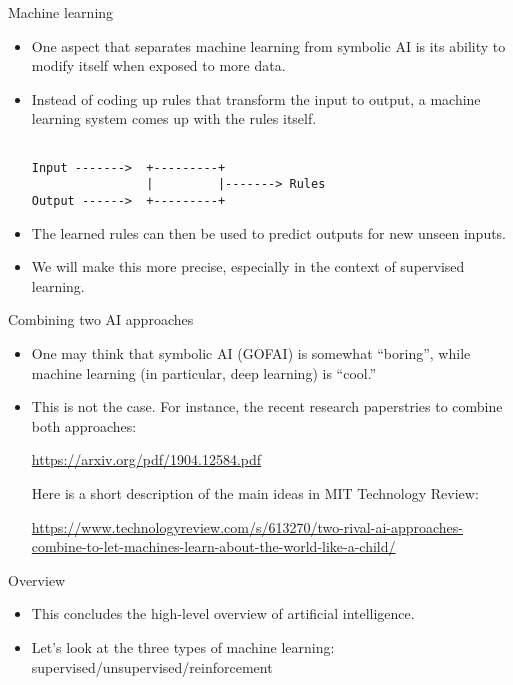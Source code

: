 \documentclass{beamer}
\begin{document}
\begin{frame}[fragile]{Machine learning}
\begin{itemize}
\item One aspect that separates machine learning from symbolic AI is its ability to modify itself when exposed to more data.

\item Instead of coding up rules that transform the input to output, a machine learning system comes up with the rules itself.

\begin{verbatim}

Input ------->  +---------+
                |         |-------> Rules
Output ------>  +---------+

\end{verbatim}
\item The learned rules can then be used to predict outputs for new unseen inputs.

\item We will make this more precise, especially in the context of supervised learning.
\end{itemize}
\end{frame}

\begin{frame}{Combining two AI approaches}
\begin{itemize}
\item One may think that symbolic AI (GOFAI) is somewhat ``boring'', while machine learning (in particular, deep learning) is ``cool.''

\item This is not the case. For instance, the recent research paperstries to combine both approaches:

\medskip
\url{https://arxiv.org/pdf/1904.12584.pdf}

\medskip
Here is a short description of the main ideas in MIT  Technology Review:

{\tiny \url{https://www.technologyreview.com/s/613270/two-rival-ai-approaches-combine-to-let-machines-learn-about-the-world-like-a-child/}}
\end{itemize}
\end{frame}

\begin{frame}{Overview}
\begin{itemize}
\item This concludes the high-level overview of artificial intelligence.

\item Let's look at the three types of machine learning: supervised/unsupervised/reinforcement
\end{itemize}
\end{frame}

%
%
%
\end{document}
